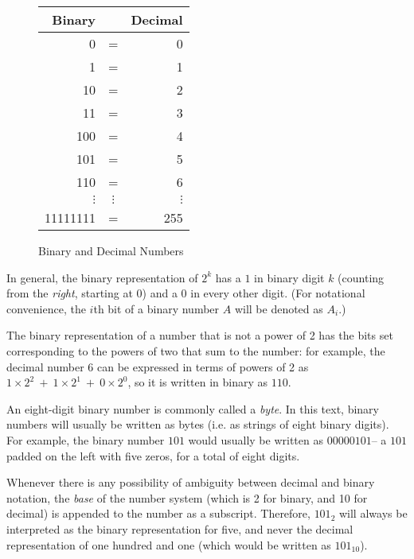 \begin{figure}[hbtp]
\caption{Binary and Decimal Numbers}
\label{datarep-binary-decimal-table}
\begin{center}
\begin{tabular}{|rcr|}
\hline
{\bf Binary}    &       & {\bf Decimal} \\
\hline
       0        & =             & 0     \\
       1        & =             & 1     \\
      10        & =             & 2     \\
      11        & =             & 3     \\
     100        & =             & 4     \\
     101        & =             & 5     \\
     110        & =             & 6     \\
$\vdots$        & $\vdots$      & $\vdots$      \\
11111111        & =             & 255   \\
\hline
\end{tabular}
\end{center}
\end{figure}

In general, the binary representation of $2^{k}$ has a $1$ in
binary digit $k$ (counting from the {\em right}, starting at 0)
and a $0$ in every other digit.
(For notational convenience,
the $i$th bit of a binary number $A$ will be
denoted as $A_{i}$.)

The binary representation of a number that is not a power
of 2 has the bits set corresponding to the powers of two
that sum to the number:  for example, the decimal number
$6$ can be expressed in terms of powers of 2 as
$1 \times 2^{2} ~+~ 1 \times 2^{1} ~+~ 0 \times 2^{0}$,
so it is written in binary as $110$.

An eight-digit binary number is commonly called a {\em byte}.
In this text, binary numbers will usually be written as bytes
(i.e. as strings of eight binary digits).  For example, the binary number
$101$ would usually be written as $00000101$-- a $101$
padded on the left with five zeros, for a total of eight digits.

Whenever there is any possibility of ambiguity between
decimal and binary notation, the {\em base} of the number
system (which is 2 for binary, and 10 for decimal) is
appended to the number as a subscript.  Therefore, $101_{2}$
will always be interpreted as the binary representation for five,
and never the decimal representation of one hundred and one
(which would be written as $101_{10}$).

